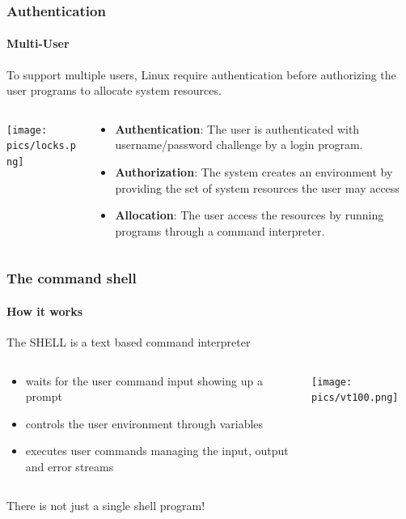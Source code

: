 \documentclass[unknownkeysallowed, 10pt, a4 paper, handout]{beamer}
\begin{document}
\begin{frame}[label=login]
  \frametitle{Authentication}
  \framesubtitle{Multi-User}
  To support multiple users, Linux require authentication before
  authorizing the user programs to allocate system resources.
  \begin{columns}[T]
    \begin{column}{.23\textwidth}
      \begin{center}
        \texttt{[image: pics/locks.png]}
      \end{center}
    \end{column}
    \hfill
    \begin{column}{.66\textwidth}
    \vspace{5mm}
    \small{
      \begin{itemize}
        \item \textbf{Authentication}: The user is authenticated with
          username/password challenge by a login program.
        \item \textbf{Authorization}: The system creates an environment
          by providing the set of system resources the user may access 
        \item \textbf{Allocation}: The user access the resources by
          running programs through a command interpreter.
      \end{itemize}
      }
    \end{column}
  \end{columns}
\end{frame}


\begin{frame}[label=shell]
  \frametitle{The command shell}
  \framesubtitle{How it works}
  The SHELL is a text based command interpreter
  \begin{columns}[T]
    \begin{column}{.60\textwidth}
    \begin{center}
    \begin{block}
    \small{
      \begin{itemize}
        \item waits for the user command input showing up a prompt 
        \item controls the user environment through variables
        \item executes user commands managing the input, output
                 and error streams
      \end{itemize}
      }
    \end{block}
    \end{center}
    \end{column}
    \hfill
    \begin{column}{.40\textwidth}
      \begin{center}
        \texttt{[image: pics/vt100.png]}
      \end{center}
    \end{column}
  \end{columns}
  \begin{center}
    There is not just a single shell program!
  \end{center}
\end{frame}
\end{document}
